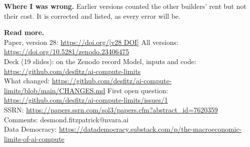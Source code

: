 \documentclass[11pt,letterpaper]{article}
\newcommand{\lead}[1]{{\sffamily\bfseries\color{lead}#1}}
\begin{document}
\lead{Where I was wrong.} Earlier versions counted the other builders' rent but not their cost. It is corrected and listed, as every error will be.

{\footnotesize\sloppy\textbf{Read more.}\\
Paper, version 28: \url{https://doi.org/[v28 DOI]} \quad All versions: \url{https://doi.org/10.5281/zenodo.23406475}\\
Deck (19 slides): on the Zenodo record \quad Model, inputs and code: \url{https://github.com/desfitz/ai-compute-limits}\\
What changed: \url{https://github.com/desfitz/ai-compute-limits/blob/main/CHANGES.md} \quad First open question: \url{https://github.com/desfitz/ai-compute-limits/issues/1}\\
SSRN: \url{https://papers.ssrn.com/sol3/papers.cfm?abstract_id=7620359} \quad Comments: desmond.fitzpatrick@nvara.ai\\
Data Democracy: \url{https://datademocracy.substack.com/p/the-macroeconomic-limits-of-ai-compute}}
\end{document}
